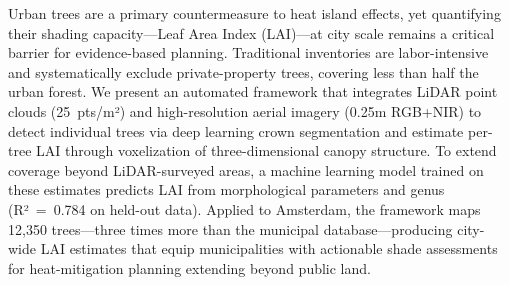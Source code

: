 Urban trees are a primary countermeasure to heat island effects, yet quantifying their shading capacity---Leaf Area Index (LAI)---at city scale remains a critical barrier for evidence-based planning. Traditional inventories are labor-intensive and systematically exclude private-property trees, covering less than half the urban forest. We present an automated framework that integrates LiDAR point clouds (25~pts/m²) and high-resolution aerial imagery (0.25m RGB+NIR) to detect individual trees via deep learning crown segmentation and estimate per-tree LAI through voxelization of three-dimensional canopy structure. To extend coverage beyond LiDAR-surveyed areas, a machine learning model trained on these estimates predicts LAI from morphological parameters and genus (R²~=~0.784 on held-out data). Applied to Amsterdam, the framework maps 12,350 trees---three times more than the municipal database---producing city-wide LAI estimates that equip municipalities with actionable shade assessments for heat-mitigation planning extending beyond public land.
